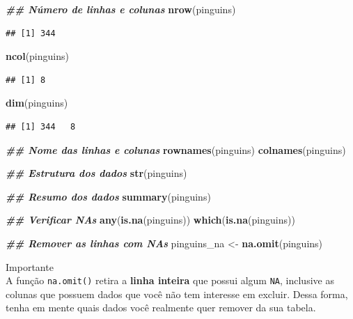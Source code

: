 \documentclass[
]{article}
\newenvironment{Shaded}{\begin{snugshade}}{\end{snugshade}}
\newcommand{\DocumentationTok}[1]{\textcolor[rgb]{0.56,0.35,0.01}{\textbf{\textit{#1}}}}
\newcommand{\FunctionTok}[1]{\textcolor[rgb]{0.13,0.29,0.53}{\textbf{#1}}}
\newcommand{\NormalTok}[1]{#1}
\newcommand{\OtherTok}[1]{\textcolor[rgb]{0.56,0.35,0.01}{#1}}
\begin{document}
\begin{Shaded}
\begin{Highlighting}[]
\DocumentationTok{\#\# Número de linhas e colunas}
\FunctionTok{nrow}\NormalTok{(pinguins)}
\end{Highlighting}
\end{Shaded}

\begin{verbatim}
## [1] 344
\end{verbatim}

\begin{Shaded}
\begin{Highlighting}[]
\FunctionTok{ncol}\NormalTok{(pinguins)}
\end{Highlighting}
\end{Shaded}

\begin{verbatim}
## [1] 8
\end{verbatim}

\begin{Shaded}
\begin{Highlighting}[]
\FunctionTok{dim}\NormalTok{(pinguins)}
\end{Highlighting}
\end{Shaded}

\begin{verbatim}
## [1] 344   8
\end{verbatim}

\begin{Shaded}
\begin{Highlighting}[]
\DocumentationTok{\#\# Nome das linhas e colunas}
\FunctionTok{rownames}\NormalTok{(pinguins)}
\FunctionTok{colnames}\NormalTok{(pinguins)}

\DocumentationTok{\#\# Estrutura dos dados}
\FunctionTok{str}\NormalTok{(pinguins)}

\DocumentationTok{\#\# Resumo dos dados}
\FunctionTok{summary}\NormalTok{(pinguins)}

\DocumentationTok{\#\# Verificar NAs}
\FunctionTok{any}\NormalTok{(}\FunctionTok{is.na}\NormalTok{(pinguins))}
\FunctionTok{which}\NormalTok{(}\FunctionTok{is.na}\NormalTok{(pinguins))}

\DocumentationTok{\#\# Remover as linhas com NAs}
\NormalTok{pinguins\_na }\OtherTok{\textless{}{-}} \FunctionTok{na.omit}\NormalTok{(pinguins)}
\end{Highlighting}
\end{Shaded}

Importante \\
A função \texttt{na.omit()} retira a \textbf{linha inteira} que possui algum \texttt{NA}, inclusive as colunas que possuem dados que você não tem interesse em excluir. Dessa forma, tenha em mente quais dados você realmente quer remover da sua tabela.
\end{document}
